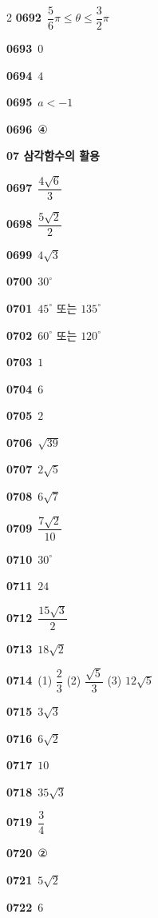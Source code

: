 \documentclass[10pt,a4paper]{article}
\begin{document}
\begin{multicols}{2}
\noindent\textbf{0692}\ $\dfrac{5}{6}\pi\le\theta\le\dfrac{3}{2}\pi$\par
\noindent\textbf{0693}\ $0$\par
\noindent\textbf{0694}\ $4$\par
\noindent\textbf{0695}\ $a<-1$\par
\noindent\textbf{0696}\ ④\par
\noindent\textbf{07 삼각함수의 활용}\par\smallskip
\noindent\textbf{0697}\ $\dfrac{4\sqrt{6}}{3}$\par
\noindent\textbf{0698}\ $\dfrac{5\sqrt{2}}{2}$\par
\noindent\textbf{0699}\ $4\sqrt{3}$\par
\noindent\textbf{0700}\ $30^\circ$\par
\noindent\textbf{0701}\ $45^\circ$ 또는 $135^\circ$\par
\noindent\textbf{0702}\ $60^\circ$ 또는 $120^\circ$\par
\noindent\textbf{0703}\ $1$\par
\noindent\textbf{0704}\ $6$\par
\noindent\textbf{0705}\ $2$\par
\noindent\textbf{0706}\ $\sqrt{39}$\par
\noindent\textbf{0707}\ $2\sqrt{5}$\par
\noindent\textbf{0708}\ $6\sqrt{7}$\par
\noindent\textbf{0709}\ $\dfrac{7\sqrt{2}}{10}$\par
\noindent\textbf{0710}\ $30^\circ$\par
\noindent\textbf{0711}\ $24$\par
\noindent\textbf{0712}\ $\dfrac{15\sqrt{3}}{2}$\par
\noindent\textbf{0713}\ $18\sqrt{2}$\par
\noindent\textbf{0714}\ (1) $\dfrac{2}{3}$ (2) $\dfrac{\sqrt{5}}{3}$ (3) $12\sqrt{5}$\par
\noindent\textbf{0715}\ $3\sqrt{3}$\par
\noindent\textbf{0716}\ $6\sqrt{2}$\par
\noindent\textbf{0717}\ $10$\par
\noindent\textbf{0718}\ $35\sqrt{3}$\par
\noindent\textbf{0719}\ $\dfrac{3}{4}$\par
\noindent\textbf{0720}\ ②\par
\noindent\textbf{0721}\ $5\sqrt{2}$\par
\noindent\textbf{0722}\ $6$\par

\end{multicols}
\end{document}
